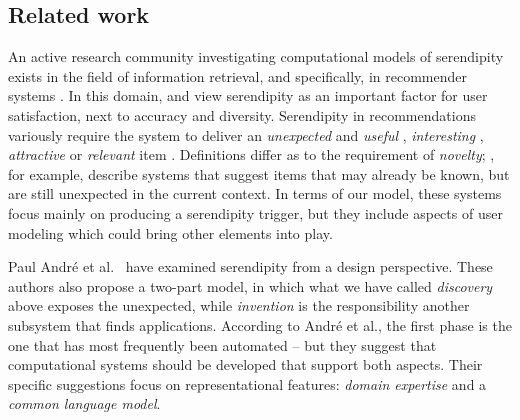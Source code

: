 \subsection{Related work} \label{sec:related}

An active research community investigating computational models of serendipity exists in the field of information retrieval, and specifically, in recommender systems \cite{Toms2000}. In this domain,  and  view serendipity as an important factor for user satisfaction, next to accuracy and diversity.  Serendipity in recommendations variously require the system to deliver an \emph{unexpected} and \emph{useful} \cite{Lu2012}, \emph{interesting} \cite{Herlocker2004}, \emph{attractive} or \emph{relevant} item \cite{Ge2010}. 
Definitions differ as to the requirement of \emph{novelty}; , for example, describe systems that suggest items that may already be known, but are still unexpected in the current context.  In terms of our model, these systems focus mainly on producing a serendipity trigger, but they include aspects of user modeling which could bring other elements into play.

Paul Andr{\'e} et al.~\citeyear{andre2009discovery} have examined
serendipity from a design perspective.  These authors also propose a
two-part model, in which what we have called \emph{discovery} above
exposes the unexpected, while \emph{invention} is the responsibility
another subsystem that finds applications.  According to Andr\'e et
al., the first phase is the one that has most frequently been
automated -- but they suggest that computational systems should be
developed that support both aspects.  Their specific suggestions focus
on representational features: \emph{domain expertise} and a
\emph{common language model}.

